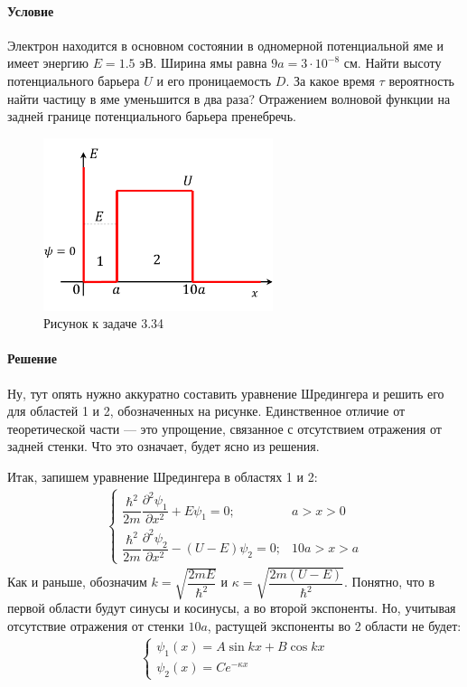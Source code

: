 \documentclass[12pt]{article}
\begin{document}
\paragraph{Условие}
Электрон находится в основном состоянии в одномерной потенциальной яме и имеет энергию $E = 1.5$ эВ. Ширина ямы равна $9a = 3 \cdot 10^{-8}$ см. Найти высоту потенциального барьера $U$ и его проницаемость $D$. За какое время $\tau$ вероятность найти частицу в яме уменьшится в два раза? Отражением волновой функции на задней границе потенциального барьера пренебречь.
\begin{figure}[h]
    \centering
    \includegraphics[width=0.6\textwidth,height=\textheight,keepaspectratio]{Seminar_04/pics/pic_05.pdf}
    \caption{Рисунок к задаче 3.34}
\end{figure}

\paragraph{Решение}
Ну, тут опять нужно аккуратно составить уравнение Шредингера и решить его для областей 1 и 2, обозначенных на рисунке. Единственное отличие от теоретической части --- это упрощение, связанное с отсутствием отражения от задней стенки. Что это означает, будет ясно из решения. 

Итак, запишем уравнение Шредингера в областях 1 и 2:
\begin{gather*}
    \begin{cases}
         \dfrac{\hbar^2}{2m}\dfrac{\partial^2\psi_1}{\partial x^2} +  E\psi_1=0; &a>x>0  \\[10pt]
         \dfrac{\hbar^2}{2m}\dfrac{\partial^2\psi_2}{\partial x^2} - (U - E)\psi_2=0; & 10a>x>a
    \end{cases}
\end{gather*}
Как и раньше, обозначим $k = \sqrt{\dfrac{2mE}{\hbar^2}}$ и $ \kappa = \sqrt{\dfrac{2m(U -E)}{\hbar^2}}$. Понятно, что в первой области будут синусы и косинусы, а во второй экспоненты. Но, учитывая отсутствие отражения от стенки $10a$, растущей экспоненты во 2 области не будет:
\begin{gather*}
    \begin{cases}
         \psi_1(x) = A \sin{kx} + B \cos{kx}\\
         \psi_2(x) = Ce^{-\kappa x} 
    \end{cases}
\end{gather*}
\end{document}
